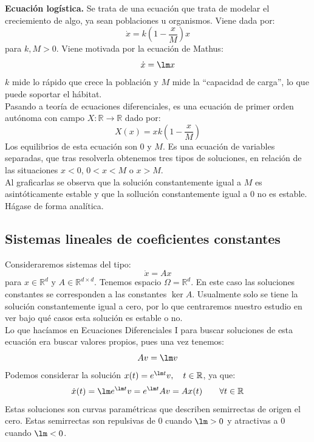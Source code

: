 \begin{ejemplo}
    \textbf{Ecuación logística.} Se trata de una ecuación que trata de modelar el creciemiento de algo, ya sean poblaciones u organismos. Viene dada por:
    \begin{equation*}
        \dot{x} = k\left(1-\frac{x}{M}\right)x
    \end{equation*}
    para $k,M>0$. Viene motivada por la ecuación de Mathus:
    \begin{equation*}
        \dot{x} = \lm x
    \end{equation*}
    $k$ mide lo rápido que crece la población y $M$ mide la ``capacidad de carga'', lo que puede soportar el hábitat.\\

    \noindent
    Pasando a teoría de ecuaciones diferenciales, es una ecuación de primer orden autónoma con campo $X:\mathbb{R}\to\mathbb{R}$ dado por:
    \begin{equation*}
        X(x) = xk\left(1-\frac{x}{M}\right)
    \end{equation*}
    Los equilibrios de esta ecuación son $0$ y $M$. Es una ecuación de variables separadas, que tras resolverla obtenemos tres tipos de soluciones, en relación de las situaciones $x<0$, $0<x<M$ o $x>M$.\\

    \noindent
    Al graficarlas se observa que la solución constantemente igual a $M$ es asintóticamente estable y que la sollución constantemente igual a $0$ no es estable. Hágase de forma analítica.
\end{ejemplo}

\subsection{Sistemas lineales de coeficientes constantes}
\noindent
Consideraremos sistemas del tipo:
\begin{equation*}
    \dot{x} = Ax
\end{equation*}
para $x\in \mathbb{R}^d$ y $A\in \mathbb{R}^{d\times d}$. Tenemos espacio $\Omega=\mathbb{R}^d$. En este caso las soluciones constantes se corresponden a las constantes $\ker A$. Usualmente solo se tiene la solución constantemente igual a cero, por lo que centraremos nuestro estudio en ver bajo qué casos esta solución es estable o no.\\

\noindent
Lo que hacíamos en Ecuaciones Diferenciales I para buscar soluciones de esta ecuación era buscar valores propios, pues una vez tenemos:
\begin{equation*}
    Av = \lm v
\end{equation*}
Podemos considerar la solución $x(t) = e^{\lm t}v, \quad t\in \mathbb{R}$, ya que:
\begin{equation*}
    \dot{x}(t) = \lm e^{\lm t}v = e^{\lm t} Av = Ax(t) \qquad \forall t\in \mathbb{R}
\end{equation*}
Estas soluciones son curvas paramétricas que describen semirrectas de origen el cero. Estas semirrectas son repulsivas de $0$ cuando $\lm>0$ y atractivas a $0$ cuando $\lm<0$.\\

